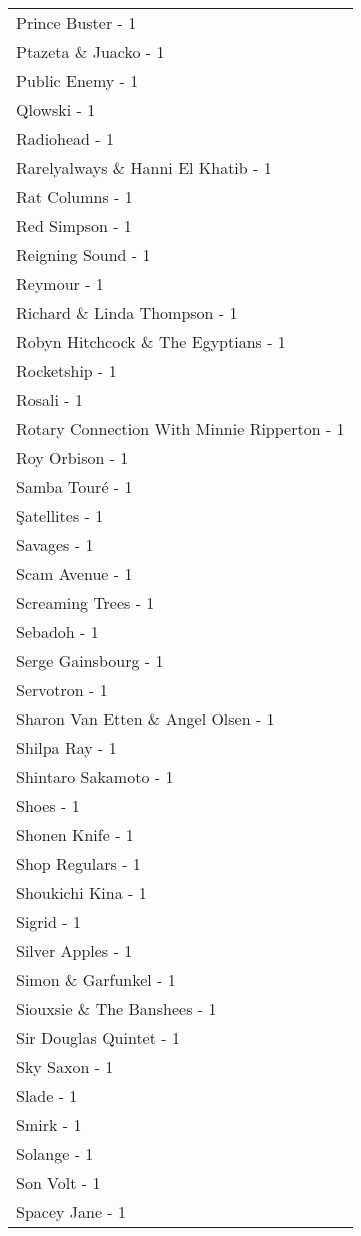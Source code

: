 \documentclass[
]{article}
\begin{document}
\begin{longtable}{l}
Prince Buster - 1 \\ 
Ptazeta \& Juacko - 1 \\ 
Public Enemy - 1 \\ 
Qlowski - 1 \\ 
Radiohead - 1 \\ 
Rarelyalways \& Hanni El Khatib - 1 \\ 
Rat Columns - 1 \\ 
Red Simpson - 1 \\ 
Reigning Sound - 1 \\ 
Reymour - 1 \\ 
Richard \& Linda Thompson - 1 \\ 
Robyn Hitchcock \& The Egyptians - 1 \\ 
Rocketship - 1 \\ 
Rosali - 1 \\ 
Rotary Connection With Minnie Ripperton - 1 \\ 
Roy Orbison - 1 \\ 
Samba Touré - 1 \\ 
Şatellites - 1 \\ 
Savages - 1 \\ 
Scam Avenue - 1 \\ 
Screaming Trees - 1 \\ 
Sebadoh - 1 \\ 
Serge Gainsbourg - 1 \\ 
Servotron - 1 \\ 
Sharon Van Etten \& Angel Olsen - 1 \\ 
Shilpa Ray - 1 \\ 
Shintaro Sakamoto - 1 \\ 
Shoes - 1 \\ 
Shonen Knife - 1 \\ 
Shop Regulars - 1 \\ 
Shoukichi Kina - 1 \\ 
Sigrid - 1 \\ 
Silver Apples - 1 \\ 
Simon \& Garfunkel - 1 \\ 
Siouxsie \& The Banshees - 1 \\ 
Sir Douglas Quintet - 1 \\ 
Sky Saxon - 1 \\ 
Slade - 1 \\ 
Smirk - 1 \\ 
Solange - 1 \\ 
Son Volt - 1 \\ 
Spacey Jane - 1 \\ 

\end{longtable}
\end{document}

